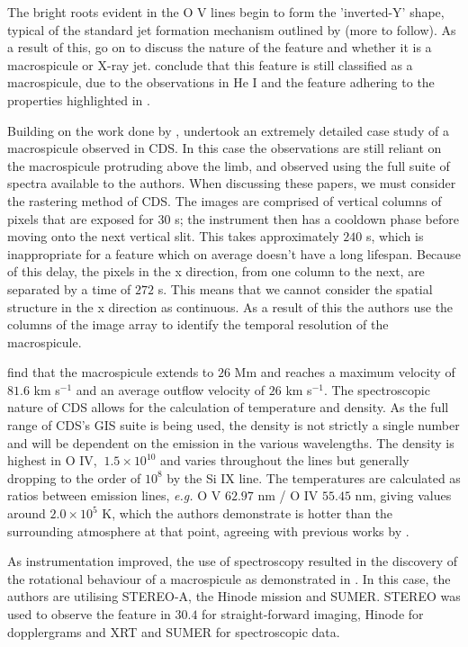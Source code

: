 The bright roots evident in the O V lines begin to form the 'inverted-Y' shape, typical of the standard jet formation mechanism outlined by \cite{Shibata1992} (more to follow).
As a result of this, \cite{Pike1997} go on to discuss the nature of the feature and whether it is a macrospicule or X-ray jet.
\cite{Pike1997} conclude that this feature is still classified as a macrospicule, due to the observations in He I and the feature adhering to the properties highlighted in \cite{Bohlin1975}.

Building on the work done by \cite{Pike1997}, \cite{Parenti2002} undertook an extremely detailed case study of a macrospicule observed in CDS.
In this case the observations are still reliant on the macrospicule protruding above the limb, and observed using the full suite of spectra available to the authors.
When discussing these papers, we must consider the rastering method of CDS.
The images are comprised of vertical columns of pixels that are exposed for $30 $ s; the instrument then has a cooldown phase before moving onto the next vertical slit.
This takes approximately $240$ s, which is inappropriate for a feature which on average doesn't have a long lifespan.
Because of this delay, the pixels in the x direction, from one column to the next, are separated by a time of $272$ s.
This means that we cannot consider the spatial structure in the x direction as continuous.
As a result of this the authors use the columns of the image array to identify the temporal resolution of the macrospicule. 

\cite{Parenti2002} find that the macrospicule extends to $26$ Mm and reaches a maximum velocity of $81.6$ km s${^{-1}}$ and an average outflow velocity of $26$ km s${^{-1}}$.
The spectroscopic nature of CDS allows for the calculation of temperature and density.
As the full range of CDS's GIS suite is being used, the density is not strictly a single number and will be dependent on the emission in the various wavelengths.
The density is highest in O IV, $~1.5 \times 10^{10}$ and varies throughout the lines but generally dropping to the order of $10^8$ by the Si IX line.
The temperatures are calculated as ratios between emission lines, \emph{e.g.} O V $62.97$ nm / O IV $55.45$ nm, giving values around $2.0 \times 10^5$ K, which the authors demonstrate is hotter than the surrounding atmosphere at that point, agreeing with previous works by \cite{Habbal1991}.

As instrumentation improved, the use of spectroscopy resulted in the discovery of the rotational behaviour of a macrospicule as demonstrated in \cite{Kamio2010}.
In this case, the authors are utilising STEREO-A, the Hinode mission and SUMER. 
STEREO was used to observe the feature in $30.4$ for straight-forward imaging, Hinode for dopplergrams and XRT and SUMER for spectroscopic data.


